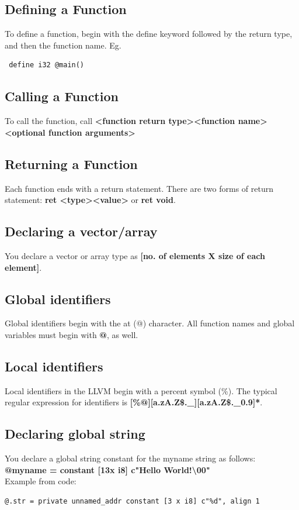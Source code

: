 \documentclass{article}
\begin{document}
\subsection{Defining a Function}
To define a function, begin with the define keyword followed by the return type, and then the function name. Eg.\begin{verbatim}
 define i32 @main()
\end{verbatim} 

\subsection{Calling a Function}
To call the function, call \textbf{\textless function return type\textgreater \textless function name\textgreater \textless optional function arguments\textgreater}

\subsection{Returning a Function}
Each function ends with a return statement. There are two forms of return statement: \textbf{ret \textless type\textgreater \textless value\textgreater} or \textbf{ret void}.

\subsection{Declaring a vector/array}
You declare a vector or array type as \textbf{[no. of elements X size of each element]}.

\subsection{Global identifiers}
Global identifiers begin with the at (@) character. All function names and global variables must begin with \textbf{@}, as well.

\subsection{Local identifiers}
Local identifiers in the LLVM begin with a percent symbol (\%). The typical regular expression for identifiers is \textbf{[\%@][a.zA.Z\$.\_][a.zA.Z\$.\_0.9]*}.

\subsection{Declaring global string}
You declare a global string constant for the myname string as follows: \textbf{@myname = constant [13x i8] c"Hello World!\textbackslash00"}\\
Example from code:\\
\begin{verbatim}
@.str = private unnamed_addr constant [3 x i8] c"%d", align 1
\end{verbatim}
\end{document}
